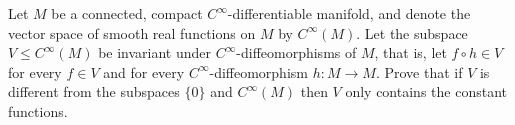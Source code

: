 Let $M$ be a connected, compact $C^{\infty}$-differentiable manifold, and denote the vector space of smooth real functions on $M$ by $C^{\infty}(M)$. Let the subspace $V\le C^{\infty}(M)$ be invariant under $C^{\infty}$-diffeomorphisms of $M$, that is, let $f\circ h\in V$ for every $f\in V$ and for every $C^{\infty}$-diffeomorphism $h\colon M\rightarrow M$. Prove that if $V$ is different from the subspaces $\{ 0\}$ and $C^{\infty}(M)$ then $V$ only contains the constant functions.